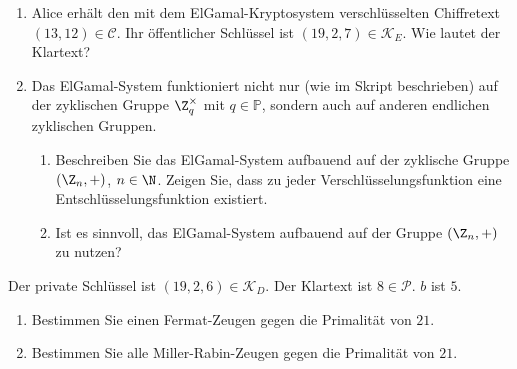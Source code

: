 \documentclass[german]{mhexsheet}
\newcommand{\mc}{\mathcal}
\begin{document}
\maketitle
% 

 \begin{exercise}[title = ElGamal-Kryptosystem]
  \begin{enumerate}
   \item Alice erhält den mit dem ElGamal-Kryptosystem verschlüsselten Chiffretext $(13, 12) \in \mc C$. Ihr öffentlicher Schlüssel ist $(19, 2, 7) \in \mc K_E$. Wie lautet der Klartext?
   \item Das ElGamal-System funktioniert nicht nur (wie im Skript beschrieben) auf der zyklischen Gruppe $\Z_q^{\times}$ mit $q \in \mathbb P$, sondern auch auf anderen endlichen zyklischen Gruppen. 
   \begin{enumerate}
   \item Beschreiben Sie das ElGamal-System aufbauend auf der zyklische Gruppe $(\Z_n, +)$, $n \in \N$. Zeigen Sie, dass zu jeder Verschlüsselungsfunktion eine Entschlüsselungsfunktion existiert. 
   \item Ist es sinnvoll, das ElGamal-System aufbauend auf der Gruppe $(\Z_n, +)$ zu nutzen?
   \end{enumerate}
  \end{enumerate}
 \end{exercise}
\begin{solution}
 Der private Schlüssel ist $(19, 2, 6) \in \mc K_D$. Der Klartext ist $8 \in \mc P$. $b$ ist $5$. 
\end{solution}

 
 \begin{exercise}[title = Primzahltests]
  \begin{enumerate}
   \item Bestimmen Sie einen Fermat-Zeugen gegen die Primalität von $21$.
   \item Bestimmen Sie alle Miller-Rabin-Zeugen gegen die Primalität von $21$. 
  \end{enumerate}
 \end{exercise}
\end{document}
